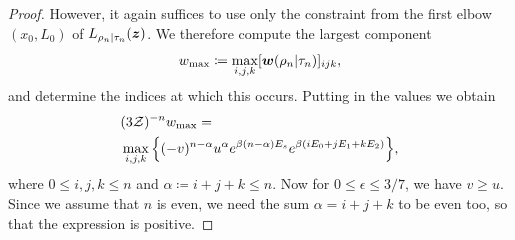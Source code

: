 \documentclass[pra,
aps,
twocolumn,
superscriptaddress,
groupedaddress,
nofootinbib,
reprint
]{revtex4-1}
\begin{document}
\begin{proof}
However, it again suffices to use only the constraint from the first elbow $(x_0, L_0)$ of $L_{\rho_n|\tau_n}(\bm{z})$. We therefore compute the largest component 
\begin{equation}
	w_{\rm max} \coloneqq \max_{i,j,k} [\boldsymbol{w}(\rho_n | \tau_n)]_{ijk},
\end{equation}
and determine the indices at which this occurs.
Putting in the values we obtain
\begin{align}
	&(3\mathcal{Z})^{-n}w_{\rm max} = \nonumber\\
	&\max\limits_{i,j,k}\Big\{ (-v)^{n-\alpha} u^{\alpha} e^{\beta (n-\alpha)E_s} e^{\beta ( i E_0 + j E_1 + k E_2 )} \Big\}, \label{eq:max_slope}
\end{align}
where $0 \leq i,j,k \leq n$ and $\alpha \coloneqq i+j+k \leq n$.
Now for $0 \leq \epsilon \leq 3/7$, we have $v \geq u$. Since we assume that $n$ is even, we need the sum $\alpha = i+j+k$ to be even too, so that the expression is positive. 


\end{proof}
\end{document}
